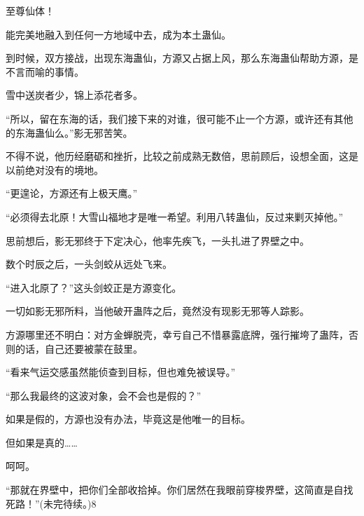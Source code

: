 \begin{this_body}
至尊仙体！

能完美地融入到任何一方地域中去，成为本土蛊仙。

到时候，双方接战，出现东海蛊仙，方源又占据上风，那么东海蛊仙帮助方源，是不言而喻的事情。

雪中送炭者少，锦上添花者多。

“所以，留在东海的话，我们接下来的对谁，很可能不止一个方源，或许还有其他的东海蛊仙么。”影无邪苦笑。

不得不说，他历经磨砺和挫折，比较之前成熟无数倍，思前顾后，设想全面，这是以前绝对没有的境地。

“更遑论，方源还有上极天鹰。”

“必须得去北原！大雪山福地才是唯一希望。利用八转蛊仙，反过来剿灭掉他。”

思前想后，影无邪终于下定决心，他率先疾飞，一头扎进了界壁之中。

数个时辰之后，一头剑蛟从远处飞来。

“进入北原了？”这头剑蛟正是方源变化。

一切如影无邪所料，当他破开蛊阵之后，竟然没有现影无邪等人踪影。

方源哪里还不明白：对方金蝉脱壳，幸亏自己不惜暴露底牌，强行摧垮了蛊阵，否则的话，自己还要被蒙在鼓里。

“看来气运交感虽然能侦查到目标，但也难免被误导。”

“那么我最终的这波对象，会不会也是假的？”

如果是假的，方源也没有办法，毕竟这是他唯一的目标。

但如果是真的……

呵呵。

“那就在界壁中，把你们全部收拾掉。你们居然在我眼前穿梭界壁，这简直是自找死路！”(未完待续。)8

\end{this_body}

